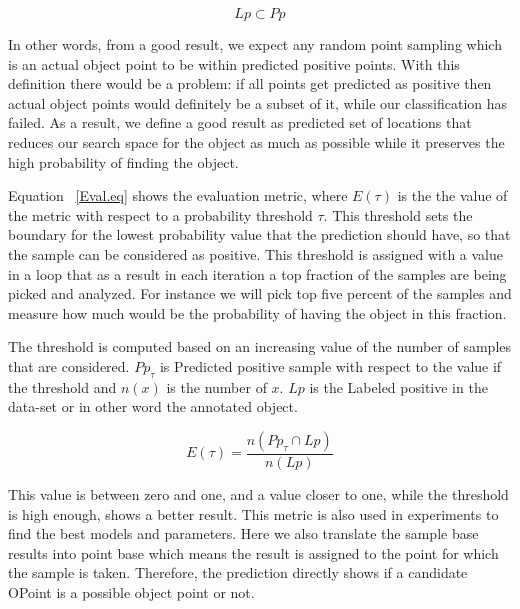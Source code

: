 \begin{equation}
 \label{Lp-PpRelation.eq}
 Lp \subset Pp
\end{equation}

In other words, from a good result, we expect any random point sampling which is an actual object point to be within predicted 
positive points.   
With this definition there would be a problem: if all points get predicted as positive then actual object points would definitely 
be a subset of it, while our classification has failed.
As a result, we define a good result as predicted set of locations that reduces our search space for the object as much as possible 
while it preserves the high probability of finding the object.

Equation ~\ref{Eval.eq} shows the evaluation metric, where $E(\tau)$ is the the value of the metric with respect to a probability 
threshold $\tau$. 
This threshold sets the boundary for the lowest probability value that the prediction should have, so that the sample can be 
considered as positive. 
This threshold is assigned with a value in a loop that as a result in each iteration a top fraction of the samples are being picked
and analyzed. 
For instance we will pick top five percent of the samples and measure how much would be the probability of having the object in 
this fraction.

The threshold is computed based on an increasing value of the number of samples that are considered.
$Pp_{\tau}$ is Predicted positive sample with respect to the value if the threshold and $n(x)$ is the number of $x$. $Lp$ is the 
Labeled positive in the data-set or in other word the annotated object.

\begin{equation}
 \label{Eval.eq}
    E(\tau) = \frac{n({Pp_{\tau}} \cap {Lp})}{n(Lp)} 
\end{equation}

This value is between zero and one, and a value closer to one, while the threshold is high enough, shows a better result.
This metric is also used in experiments to find the best models and parameters. 
Here we also translate the sample base results into point base which means the result is assigned to the point for which the sample
is taken.
Therefore, the prediction directly shows if a candidate OPoint is a possible object point or not.

